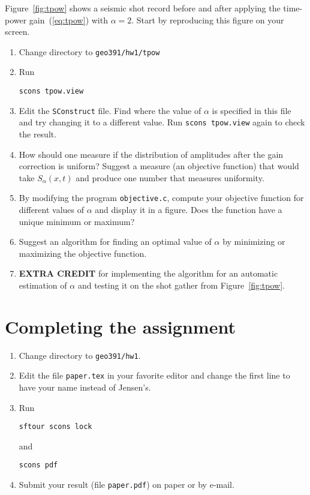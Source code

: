 
Figure~\ref{fig:tpow} shows a seismic shot record before and after
applying the time-power gain~(\ref{eq:tpow}) with $\alpha=2$. Start
by reproducing this figure on your screen.

\begin{enumerate}
\item Change directory to \verb#geo391/hw1/tpow#
\item Run
\begin{verbatim}
scons tpow.view
\end{verbatim}
\item Edit the \texttt{SConstruct} file. Find where the value of
  $\alpha$ is specified in this file and try changing it to a
  different value. Run \texttt{scons tpow.view} again to check the result.
\item How should one measure if the distribution of amplitudes after
  the gain correction is uniform? Suggest a measure (an objective
  function) that would take $S_\alpha(x,t)$ and produce one number that
  measures uniformity.
\item By modifying the program \texttt{objective.c}, compute your objective 
  function for different values of $\alpha$ and display it in a figure. 
  Does the function have a unique minimum or maximum?

\lstset{language=c,numbers=left,numberstyle=\tiny,showstringspaces=false}


\item Suggest an algorithm for finding an optimal value of $\alpha$ by
  minimizing or maximizing the objective function.
\item \textbf{EXTRA CREDIT} for implementing the algorithm for an automatic 
estimation of $\alpha$ and testing it on the shot gather from Figure~\ref{fig:tpow}.

\end{enumerate}

\lstset{language=python,numbers=left,numberstyle=\tiny,showstringspaces=false}


\section{Completing the assignment}

\begin{enumerate}
\item Change directory to \verb#geo391/hw1#.
\item Edit the file \texttt{paper.tex} in your favorite editor and change the
first line to have your name instead of Jensen's.
\item Run
\begin{verbatim}
sftour scons lock
\end{verbatim}
and
\begin{verbatim}
scons pdf
\end{verbatim}
\item Submit your result (file \texttt{paper.pdf}) on paper or by
e-mail.
\end{enumerate}

